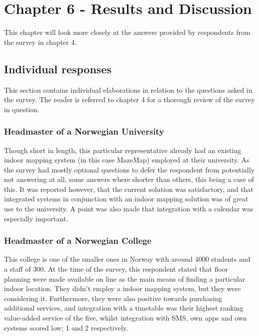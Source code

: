 \chapter{Chapter 6 - Results and Discussion}
This chapter will look more closely at the answers provided by respondents from the survey in chapter 4. 
\section{Individual responses}
This section contains individual elaborations in relation to the questions asked in the survey. The reader is referred to chapter 4 for a thorough review of the survey in question.
\subsection{Headmaster of a Norwegian University}
Though short in length, this particular representative already had an existing indoor mapping system (in this case MazeMap) employed at their university. As the survey had mostly optional questions to defer the respondent from potentially not answering at all, some answers where shorter than others, this being a case of this. It was reported however, that the current solution was satisfactory, and that integrated systems in conjunction with an indoor mapping solution was of great use to the university. A point was also made that integration with a calendar was especially important.
\subsection{Headmaster of a Norwegian College}
This college is one of the smaller ones in Norway with around 4000 students and a staff of 300. At the time of the survey, this respondent stated that floor planning were made available on line as the main means of finding a particular indoor location. They didn't employ a indoor mapping system, but they were considering it. Furthermore, they were also positive towards purchasing additional services, and integration with a timetable was their highest ranking value-added service of the five, whilst integration with SMS, own apps and own systems scored low; 1 and 2 respectively.
